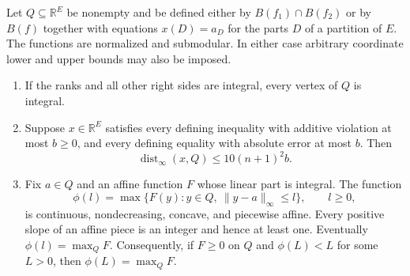 \begin{lemma}\label{lem:polyhedral-controls}
Let $Q\subseteq\mathbb R^E$ be nonempty and be defined either by
$B(f_1)\cap B(f_2)$ or by $B(f)$ together with equations
$x(D)=a_D$ for the parts $D$ of a partition of $E$.
The functions are normalized and submodular.  In either case arbitrary
coordinate lower and upper bounds may also be imposed.
\begin{enumerate}
 \item If the ranks and all other right sides are integral, every
 vertex of $Q$ is integral.
 \item Suppose $x\in\mathbb R^E$ satisfies every defining inequality
 with additive violation at most $b\geq0$, and every defining equality
 with absolute error at most $b$.  Then
 \begin{equation}\label{eq:polyhedral-distance}
  \operatorname{dist}_{\infty}(x,Q)\leq10(n+1)^2b.
 \end{equation}
 \item Fix $a\in Q$ and an affine function $F$ whose linear part is
 integral.  The function
 \[
  \phi(l)=\max\{F(y):y\in Q,\ \|y-a\|_\infty\leq l\},
  \qquad l\geq0,
 \]
 is continuous, nondecreasing, concave, and piecewise affine.  Every
 positive slope of an affine piece is an integer and hence at least
 one.  Eventually $\phi(l)=\max_Q F$.
 Consequently, if $F\geq0$ on $Q$ and $\phi(L)<L$ for some $L>0$,
 then $\phi(L)=\max_QF$.
\end{enumerate}
\end{lemma}

